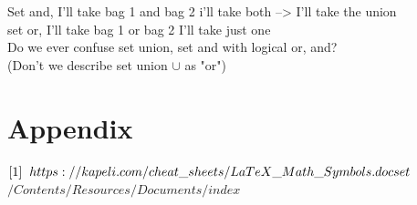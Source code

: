 \documentclass[11pt]{article}
\begin{document}
Set and, I'll take bag 1 and bag 2 i'll take both --> I'll take the union\\
set or, I'll take bag 1 or bag 2 I'll take just one\\

Do we ever confuse set union, set and with logical or, and?\\
(Don't we describe set union $\cup$ as "or")

\section{Appendix}
$
\lbrack1\rbrack \hspace{2mm} https://kapeli.com/cheat\_sheets/LaTeX\_Math\_Symbols.docset\\
$
$
/Contents/Resources/Documents/index
$
\end{document}
